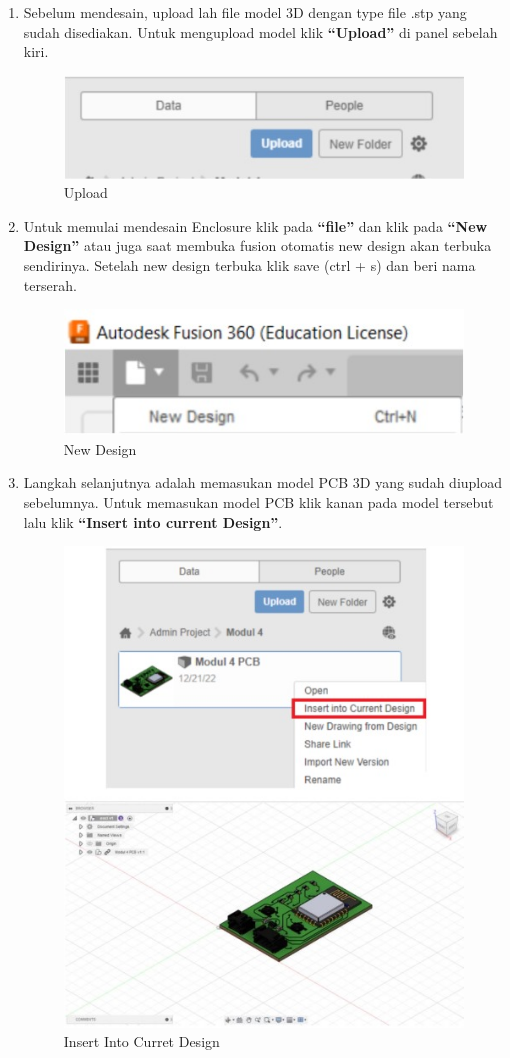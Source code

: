 \begin{enumerate}
    \item Sebelum mendesain, upload lah file model 3D dengan type file .stp yang sudah disediakan. Untuk
    mengupload model klik \textbf{“Upload”} di panel sebelah kiri.
        \begin{figure}[H]
            \centering
            \includegraphics[width=0.5\linewidth]{P3/img/image3.jpg}
            \caption{Upload}
            \label{fig:Upload}
        \end{figure}

    \item Untuk memulai mendesain Enclosure klik pada \textbf{“file”} dan klik pada \textbf{“New Design”} atau juga saat
    membuka fusion otomatis new design akan terbuka sendirinya. Setelah new design terbuka klik
    save (ctrl + s) dan beri nama terserah.
        \begin{figure}[H]
            \centering
            \includegraphics[width=0.5\linewidth]{P3/img/image4.jpg}
            \caption{New Design}
            \label{fig:New Design}
        \end{figure}

    \item Langkah selanjutnya adalah memasukan model PCB 3D yang sudah diupload sebelumnya. Untuk
    memasukan model PCB klik kanan pada model tersebut lalu klik \textbf{“Insert into current Design”}.
        \begin{figure}[H]
            \centering
            \includegraphics[width=0.5\linewidth]{P3/img/image5.jpg}
            \caption{Insert Into Curret Design}
            \label{fig:Insert Into Curret Design}
        \end{figure}


\end{enumerate}

